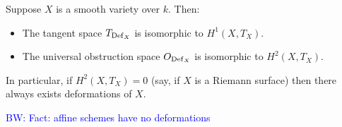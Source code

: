 \documentclass[11pt]{amsart}
\def\brian{\textcolor{blue}{BW: }\textcolor{blue}}
\begin{document}
\begin{thm}
Suppose $X$ is a smooth variety over $k$. 
Then:
\begin{itemize}
\item The tangent space $T_{{\rm Def}_X}$ is isomorphic to $H^1(X, T_X)$. 
\item The universal obstruction space $O_{{\rm Def}_X}$ is isomorphic to $H^2(X, T_X)$. 
\end{itemize}
In particular, if $H^2(X, T_X) = 0$ (say, if $X$ is a Riemann surface) then there always exists deformations of $X$. 
\end{thm}


\brian{Fact: affine schemes have no deformations}
\end{document}
